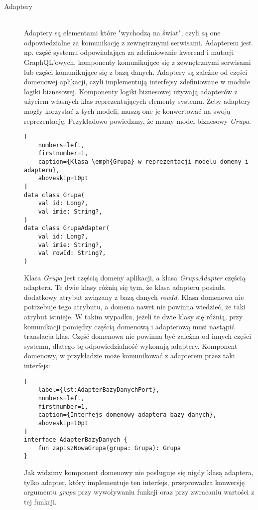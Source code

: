 \begin{description}
\vspace{0.4cm}

\item[Adaptery] \hfill \\ Adaptery są elementami które "wychodzą na świat", czyli są one odpowiedzialne za komunikację z zewnętrznymi serwisami. Adapterem jest np. część systemu odpowiadająca za zdefiniowanie kwerend i mutacji GraphQL'owych, komponenty komunikujące się z zewnętrznymi serwisami lub części komunikujące się z bazą danych. Adaptery są zależne od części domenowej aplikacji, czyli implementują interfejsy zdefiniowane w module logiki biznesowej. Komponenty logiki biznesowej używają adapterów z użyciem własnych klas reprezentujących elementy systemu. Żeby adaptery mogły korzystać z tych modeli, muszą one je konwertować na swoją reprezentację. Przykładowo powiedzmy, że mamy model biznesowy \emph{Grupa}.

\begin{addmargin}[6mm]{0mm}
\begin{lstlisting}[
    numbers=left,
    firstnumber=1,
    caption={Klasa \emph{Grupa} w reprezentacji modelu domeny i adapteru},
    aboveskip=10pt
]
data class Grupa(
    val id: Long?,
    val imie: String?,
)
data class GrupaAdapter(
    val id: Long?,
    val imie: String?,
    val rowId: String?,
)
\end{lstlisting}
\end{addmargin}

Klasa \emph{Grupa} jest częścią domeny aplikacji, a klasa \emph{GrupaAdapter} częścią adaptera. Te dwie klasy różnią się tym, że klasa adapteru posiada dodatkowy atrybut związany z bazą danych \emph{rowId}. Klasa domenowa nie potrzebuje tego atrybutu, a domena nawet nie powinna wiedzieć, że taki atrybut istnieje. W takim wypadku, jeżeli te dwie klasy się różnią, przy komunikacji pomiędzy częścią domenową i adapterową musi nastąpić translacja klas. Część domenowa nie powinna być zależna od innych części systemu, dlatego tę odpowiedzialność wykonują adaptery. Komponent domenowy, w przykładzie może komunikować z adapterem przez taki interfejs:
\begin{addmargin}[6mm]{0mm}
\begin{lstlisting}[
    label={lst:AdapterBazyDanychPort},
    numbers=left,
    firstnumber=1,
    caption={Interfejs domenowy adaptera bazy danych},
    aboveskip=10pt
]
interface AdapterBazyDanych {
    fun zapiszNowaGrupa(grupa: Grupa): Grupa
}
\end{lstlisting}
\end{addmargin}
Jak widzimy komponent domenowy nie posługuje się nigdy klasą adaptera, tylko adapter, który implementuje ten interfejs, przeprowadza konwersję argumentu \emph{grupa} przy wywoływaniu funkcji oraz przy zwracaniu wartości z tej funkcji.


\end{description}
